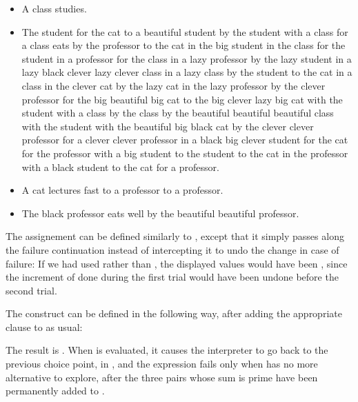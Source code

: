 \begin{exe}[4.50]
\begin{itemize}
        \item A class studies.
        \item The student for the cat to a beautiful student by the student with 
            a class for a class eats by the professor to the cat in the big 
            student in the class for the student in a professor for the class in 
            a lazy professor by the lazy student in a lazy black clever lazy 
            clever class in a lazy class by the student to the cat in a class in 
            the clever cat by the lazy cat in the lazy professor by the clever 
            professor for the big beautiful big cat to the big clever lazy big 
            cat with the student with a class by the class by the beautiful 
            beautiful beautiful class with the student with the beautiful big 
            black cat by the clever clever professor for a clever clever 
            professor in a black big clever student for the cat for the 
            professor with a big student to the student to the cat in the 
            professor with a black student to the cat for a professor.
        \item A cat lectures fast to a professor to a professor.
        \item The black professor eats well by the beautiful beautiful 
            professor.
    \end{itemize}
\end{exe}

\begin{exe}[4.51]
    The  assignement can be defined similarly to 
    , except that it simply passes along the failure continuation 
    instead of intercepting it to undo the change in case of failure:
    If we had used  rather than , the displayed 
    values would have been , since the increment of  
    done during the first trial would have been undone before the second trial.
\end{exe}

\begin{exe}[4.52]
    The  construct can be defined in the following way, after 
    adding the appropriate clause to  as usual:
\end{exe}

\begin{exe}[4.53]
    The result is . When  is 
    evaluated, it causes the interpreter to go back to the previous choice 
    point, in , and the  expression fails only 
    when  has no more alternative to explore, after the 
    three pairs whose sum is prime have been permanently added to .
\end{exe}

